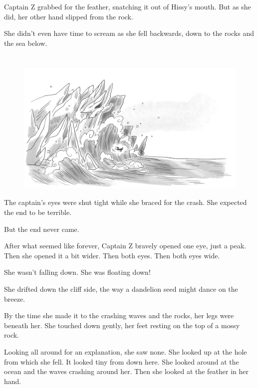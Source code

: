 \documentclass[12pt]{extbook}
\begin{document}
  Captain Z grabbed for the feather, snatching it out of Hissy's mouth.
  But as she did, her other hand slipped from the rock.
  
  She didn't even have time to scream as she fell backwards, down to the
  rocks and the sea below.
  
  \section{}\label{section-22}
  
  \begin{figure}[htbp]
  \centering
  \includegraphics{img/fall_from_castle_island.png}
  \caption{}
  \end{figure}
  
  The captain's eyes were shut tight while she braced for the crash. She
  expected the end to be terrible.
  
  But the end never came.
  
  After what seemed like forever, Captain Z bravely opened one eye, just a
  peak. Then she opened it a bit wider. Then both eyes. Then both eyes
  wide.
  
  She wasn't falling down. She was floating down!
  
  She drifted down the cliff side, the way a dandelion seed might dance on
  the breeze.
  
  By the time she made it to the crashing waves and the rocks, her legs
  were beneath her. She touched down gently, her feet resting on the top
  of a mossy rock.
  
  Looking all around for an explanation, she saw none. She looked up at
  the hole from which she fell. It looked tiny from down here. She looked
  around at the ocean and the waves crashing around her. Then she looked
  at the feather in her hand.
  
\end{document}
